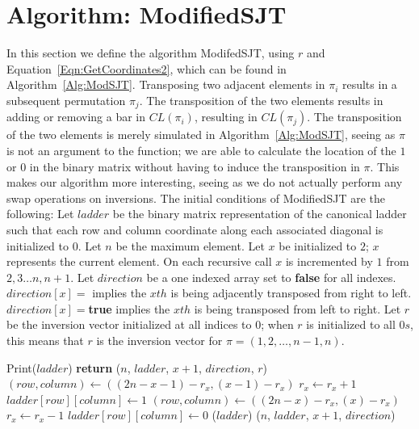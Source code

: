 {\section{Algorithm: ModifiedSJT}
In this section we define the algorithm {\sc ModifedSJT}, using $r$ and Equation~\ref{Eqn:GetCoordinates2}, 
which can be found in Algorithm~\ref{Alg:ModSJT}. Transposing two adjacent elements in $\pi_{i}$ results 
in a subsequent permutation $\pi_{j}$. The transposition of the two elements results in adding or removing a bar in 
$CL(\pi_{i})$, resulting in $CL(\pi_{j})$. The transposition of the two elements is merely simulated in Algorithm~\ref{Alg:ModSJT}, seeing 
as $\pi$ is not an argument to the function; we are able to calculate the location of the $1$ or $0$ in the binary matrix without 
having to induce the transposition in $\pi$. This makes our algorithm more interesting, seeing as we do not actually 
perform any swap operations on inversions. 
The initial conditions of {\sc ModifiedSJT} are the following:  
Let $ladder$ be the binary matrix representation of the canonical ladder such that 
each row and column coordinate along each associated diagonal is initialized to $0$.
Let $n$ be the maximum element.
Let $x$ be initialized to $2$; $x$ represents the current element. 
 On each recursive call 
$x$ is incremented by $1$ from $2,3 \dots n,n+1$. 
Let $direction$ be a one indexed array set to \textbf{false} for all indexes. $direction[x]=$ implies the $xth$ is being adjacently transposed 
from right to left. $direction[x]=$\textbf{true} implies the $xth$ is being transposed from 
left to right. Let $r$ be the inversion vector initialized at all indices to $0$; when $r$ is initialized 
to all $0s$, this means that $r$ is the inversion vector for $\pi=(1,2, \dots, n-1,n)$.
\begin{algorithm}
  \begin{algorithmic}[1]
         {\sc Print}($ladder$)\EndIf
        \State \textbf{return}
      \EndIf
          ($n$, $ladder$, $x+1$, $direction$, $r$)
        \Else 
            \State $(row,column) \gets ((2n-x-1)-r_{x},(x-1)-r_{x})$
            \State $r_{x} \gets r_{x}+1$ 
            \State $ladder[row][column] \gets 1$
          \Else
            \State $(row,column) \gets ((2n-x)-r_{x},(x)-r_{x})$
            \State $r_{x} \gets r_{x}-1$ 
            \State $ladder[row][column] \gets 0$
          \EndIf
          ($ladder$)
          ($n$, $ladder$, $x+1$, $direction$)
        \EndIf
        

\end{algorithmic}
\end{algorithm}}
